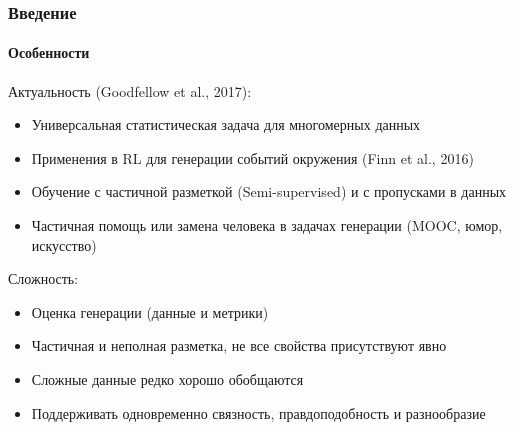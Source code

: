 \documentclass[10pt]{beamer}
\begin{document}
\begin{frame}
\frametitle{Введение}
\framesubtitle{Особенности}

Актуальность (Goodfellow et al., 2017):
\begin{itemize}
    \item Универсальная статистическая задача для многомерных данных
    \item Применения в RL для генерации событий окружения (Finn et al., 2016)
    \item Обучение с частичной разметкой (Semi-supervised) и с пропусками в данных
    \item Частичная помощь или замена человека в задачах генерации (MOOC, юмор, искусство)
\end{itemize}

Сложность:
\begin{itemize}
    \item Оценка генерации (данные и метрики)
    \item Частичная и неполная разметка, не все свойства присутствуют явно
    \item Сложные данные редко хорошо обобщаются
    \item Поддерживать одновременно связность, правдоподобность и разнообразие
\end{itemize}

\end{frame}
\end{document}

